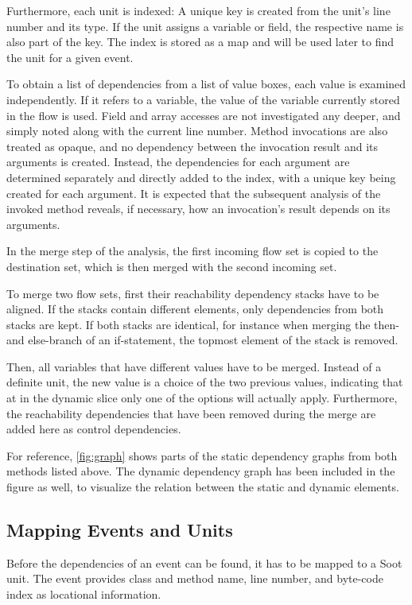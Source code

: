 Furthermore, each unit is indexed:
A unique key is created from the unit's line number and its type. 
If the unit assigns a variable or field, the respective name is also part of the key.
The index is stored as a map and will be used later to find the unit for a given event.

To obtain a list of dependencies from a list of value boxes, each value is examined independently.
If it refers to a variable, the value of the variable currently stored in the flow is used.
Field and array accesses are not investigated any deeper, and simply noted along with the current line number.
Method invocations are also treated as opaque, and no dependency between the invocation result and its arguments is created.
Instead, the dependencies for each argument are determined separately and directly added to the index, with a unique key being created for each argument.
It is expected that the subsequent analysis of the invoked method reveals, if necessary, how an invocation's result depends on its arguments.

In the merge step of the analysis, the first incoming flow set is copied to the destination set, which is then merged with the second incoming set.

To merge two flow sets, first their reachability dependency stacks have to be aligned.
If the stacks contain different elements, only dependencies from both stacks are kept.
If both stacks are identical, for instance when merging the then- and else-branch of an if-statement, the topmost element of the stack is removed.

Then, all variables that have different values have to be merged.
Instead of a definite unit, the new value is a choice of the two previous values, indicating that at in the dynamic slice only one of the options will actually apply.
Furthermore, the reachability dependencies that have been removed during the merge are added here as control dependencies.

For reference, \autoref{fig:graph} shows parts of the static dependency graphs from both methods listed above.
The dynamic dependency graph has been included in the figure as well, to visualize the relation between the static and dynamic elements.

\subsection{Mapping Events and Units}

Before the dependencies of an event can be found, it has to be mapped to a Soot unit.
The event provides class and method name, line number, and byte-code index as locational information.

